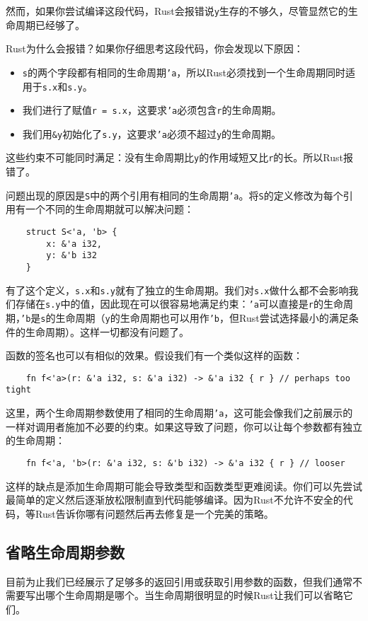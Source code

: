 然而，如果你尝试编译这段代码，Rust会报错说\texttt{y}生存的不够久，尽管显然它的生命周期已经够了。

Rust为什么会报错？如果你仔细思考这段代码，你会发现以下原因：
\begin{itemize}
    \item \texttt{s}的两个字段都有相同的生命周期\texttt{'a}，所以Rust必须找到一个生命周期同时适用于\texttt{s.x}和\texttt{s.y}。
    \item 我们进行了赋值\texttt{r = s.x}，这要求\texttt{'a}必须包含\texttt{r}的生命周期。
    \item 我们用\texttt{\&y}初始化了\texttt{s.y}，这要求\texttt{'a}必须不超过\texttt{y}的生命周期。
\end{itemize}

这些约束不可能同时满足：没有生命周期比\texttt{y}的作用域短又比\texttt{r}的长。所以Rust报错了。

问题出现的原因是\texttt{S}中的两个引用有相同的生命周期\texttt{'a}。将\texttt{S}的定义修改为每个引用有一个不同的生命周期就可以解决问题：
\begin{verbatim}
    struct S<'a, 'b> {
        x: &'a i32,
        y: &'b i32
    }
\end{verbatim}

有了这个定义，\texttt{s.x}和\texttt{s.y}就有了独立的生命周期。我们对\texttt{s.x}做什么都不会影响我们存储在\texttt{s.y}中的值，因此现在可以很容易地满足约束：\texttt{'a}可以直接是\texttt{r}的生命周期，\texttt{'b}是\texttt{s}的生命周期（\texttt{y}的生命周期也可以用作\texttt{'b}，但Rust尝试选择最小的满足条件的生命周期）。这样一切都没有问题了。

函数的签名也可以有相似的效果。假设我们有一个类似这样的函数：
\begin{verbatim}
    fn f<'a>(r: &'a i32, s: &'a i32) -> &'a i32 { r } // perhaps too tight
\end{verbatim}

这里，两个生命周期参数使用了相同的生命周期\texttt{'a}，这可能会像我们之前展示的一样对调用者施加不必要的约束。如果这导致了问题，你可以让每个参数都有独立的生命周期：
\begin{verbatim}
    fn f<'a, 'b>(r: &'a i32, s: &'b i32) -> &'a i32 { r } // looser
\end{verbatim}

这样的缺点是添加生命周期可能会导致类型和函数类型更难阅读。你们可以先尝试最简单的定义然后逐渐放松限制直到代码能够编译。因为Rust不允许不安全的代码，等Rust告诉你哪有问题然后再去修复是一个完美的策略。

\subsection{省略生命周期参数}\label{OmitLifeTime}
目前为止我们已经展示了足够多的返回引用或获取引用参数的函数，但我们通常不需要写出哪个生命周期是哪个。当生命周期很明显的时候Rust让我们可以省略它们。

